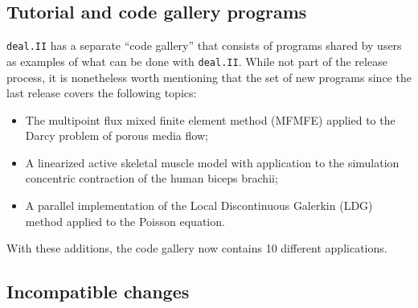 \documentclass{ansarticle-preprint}
\newcommand{\specialword}[1]{\texttt{#1}}
\newcommand{\dealii}{{\specialword{deal.II}}\xspace}
\begin{document}
\subsection{Tutorial and code gallery programs}


\dealii has a separate ``code gallery'' that
consists of programs shared by users as examples of what can be
done with \dealii. While not part of the release process, it is nonetheless
worth mentioning that the set of new programs since the last release covers
the following topics:
\begin{itemize}
\item The multipoint flux mixed finite element method (MFMFE) applied
  to the Darcy problem of porous media flow;
\item A linearized active skeletal muscle model with application to
  the simulation concentric contraction of the human biceps brachii;
\item A parallel implementation of the Local Discontinuous Galerkin
  (LDG) method applied to the Poisson equation.
\end{itemize}
With these additions, the code gallery now contains 10 different applications.


\subsection{Incompatible changes}
\end{document}
